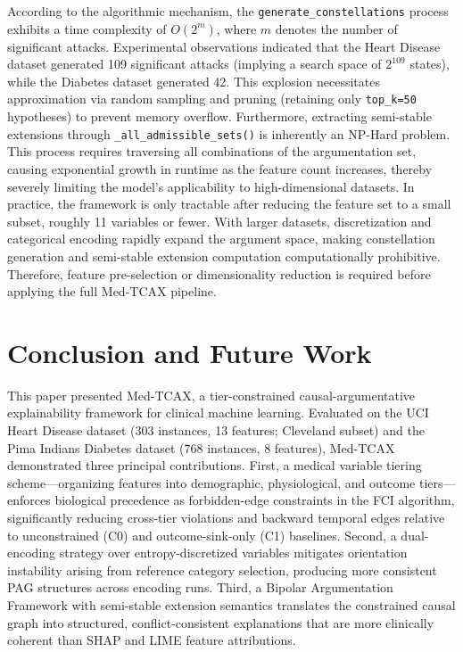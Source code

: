 \documentclass[conference, a4paper]{IEEEtran}
\begin{document}
According to the algorithmic mechanism, the \texttt{generate\_constellations} process exhibits a time complexity of $O(2^m)$, where $m$ denotes the number of significant attacks. Experimental observations indicated that the Heart Disease dataset generated 109 significant attacks (implying a search space of $2^{109}$ states), while the Diabetes dataset generated 42. This explosion necessitates approximation via random sampling and pruning (retaining only \texttt{top\_k=50} hypotheses) to prevent memory overflow. Furthermore, extracting semi-stable extensions through \texttt{\_all\_admissible\_sets()} is inherently an NP-Hard problem. This process requires traversing all combinations of the argumentation set, causing exponential growth in runtime as the feature count increases, thereby severely limiting the model's applicability to high-dimensional datasets. In practice, the framework is only tractable after reducing the feature set to a small subset, roughly 11 variables or fewer. With larger datasets, discretization and categorical encoding rapidly expand the argument space, making constellation generation and semi-stable extension computation computationally prohibitive. Therefore, feature pre-selection or dimensionality reduction is required before applying the full Med-TCAX pipeline.
\section{Conclusion and Future Work}

This paper presented Med-TCAX, a tier-constrained causal-argumentative explainability framework for clinical machine learning. Evaluated on the UCI Heart Disease dataset (303 instances, 13 features; Cleveland subset) and the Pima Indians Diabetes dataset (768 instances, 8 features), Med-TCAX demonstrated three principal contributions. First, a medical variable tiering scheme—organizing features into demographic, physiological, and outcome tiers—enforces biological precedence as forbidden-edge constraints in the FCI algorithm, significantly reducing cross-tier violations and backward temporal edges relative to unconstrained (C0) and outcome-sink-only (C1) baselines. Second, a dual-encoding strategy over entropy-discretized variables mitigates orientation instability arising from reference category selection, producing more consistent PAG structures across encoding runs. Third, a Bipolar Argumentation Framework with semi-stable extension semantics translates the constrained causal graph into structured, conflict-consistent explanations that are more clinically coherent than SHAP and LIME feature attributions.
\end{document}
